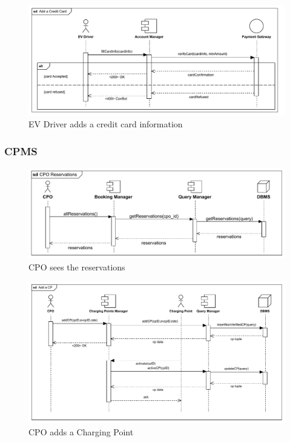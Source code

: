 \begin{figure}[H]
    \centering
    \includegraphics[scale=0.55]{src/runtimeVIew/eMSP_AddCC.pdf}
    \caption{EV Driver adds a credit card information}
\end{figure}

\subsubsection{CPMS}
\begin{figure}[H]
    \centering
    \includegraphics[scale=0.55]{src/runtimeVIew/CPMS_Reservations.pdf}
    \caption{CPO sees the reservations}
\end{figure}

\begin{figure}[H]
    \centering
    \includegraphics[scale=0.55]{src/runtimeVIew/CPMS_AddCP.pdf}
    \caption{CPO adds a Charging Point}
\end{figure}

